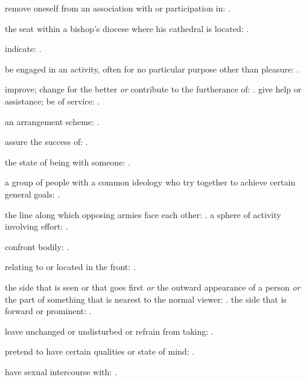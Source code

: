   remove oneself from an association with or participation in:   .

  the seat within a bishop's diocese where his cathedral is located: .

  indicate: .

  be engaged in an activity, often for no particular purpose other than pleasure: .

  improve; change for the better \textit{or} contribute to the furtherance of: . give help or assistance; be of service:   .

  an arrangement scheme:   .

  assure the success of: .

  the state of being with someone:   .

  a group of people with a common ideology who try together to achieve certain general goals:   .

  the line along which opposing armies face each other:   . a sphere of activity involving effort: .

  confront bodily:   .

  relating to or located in the front: .

  the side that is seen or that goes first \textit{or} the outward appearance of a person \textit{or} the part of something that is nearest to the normal viewer: . the side that is forward or prominent:   .

  leave unchanged or undisturbed or refrain from taking:   .

  pretend to have certain qualities or state of mind:   .

  have sexual intercourse with:   .

